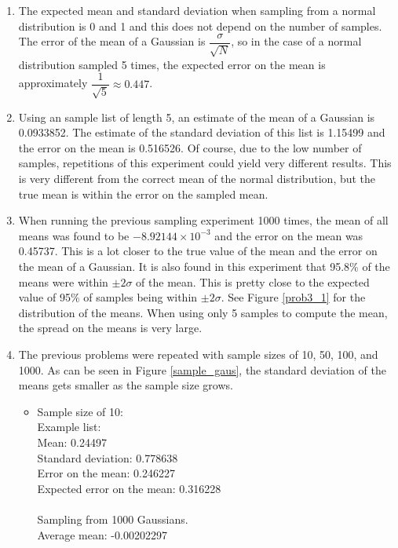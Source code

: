 \documentclass[11pt,letterpaper]{article}
\begin{document}
\begin{enumerate}
\item The expected mean and standard deviation when sampling from a normal
    distribution is 0 and 1 and this does not depend on the number of samples.
    The error of the mean of a Gaussian is $\dfrac{\sigma}{\sqrt{N}}$, so in the
    case of a normal distribution sampled 5 times, the expected error on the
    mean is approximately  $\dfrac{1}{\sqrt{5}} \approx 0.447$.
\item Using an sample list of length 5, an estimate of the mean of a Gaussian is
    0.0933852. The estimate of the standard deviation of this list is 1.15499
    and the error on the mean is 0.516526. Of course, due to the low number of
    samples, repetitions of this experiment could yield very different results.
    This is very different from the correct mean of the normal distribution, but
    the true mean is within the error on the sampled mean.
\item When running the previous sampling experiment 1000 times, the mean of all
    means was found to be $-8.92144 \times 10^{-3}$ and the error on the mean
    was 0.45737. This is a lot closer to the true value of the mean and the
    error on the mean of a Gaussian. It is also found in this experiment that
    95.8\% of the means were within $\pm 2\sigma$ of the mean. This is pretty
    close to the expected value of 95\% of samples being within $\pm 2\sigma$.
    See Figure \ref{prob3_1} for the distribution of the means. When using only
    5 samples to compute the mean, the spread on the means is very large.
\item The previous problems were repeated with sample sizes of 10, 50, 100,
    and 1000. As can be seen in Figure \ref{sample_gaus}, the standard deviation
    of the means gets smaller as the sample size grows.
    \begin{itemize}
    \item Sample size of 10:\\
        Example list:\\
        Mean: 0.24497\\
        Standard deviation: 0.778638\\
        Error on the mean: 0.246227\\
        Expected error on the mean: 0.316228\\
        \ \\
        Sampling from 1000 Gaussians.\\
        Average mean: -0.00202297\\

\end{itemize}
\end{enumerate}
\end{document}
